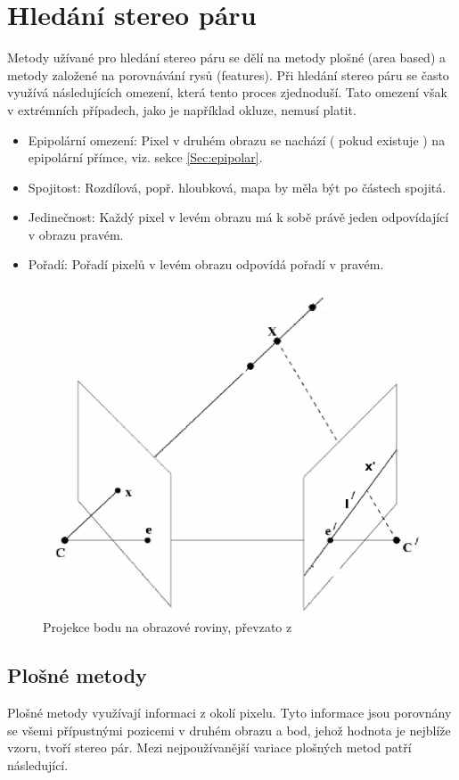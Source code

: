 \documentclass[twoside]{ctuthesis}
\begin{document}
\section{Hledání stereo páru}
Metody užívané pro hledání stereo páru se dělí na metody plošné (area based) a metody založené na porovnávání rysů (features). Při hledání stereo páru se často využívá následujících omezení, která tento proces zjednoduší. Tato omezení však v extrémních případech, jako je například okluze,  nemusí platit.
\begin{itemize}
    \item Epipolární omezení: Pixel v druhém obrazu se nachází ( pokud existuje ) na epipolární přímce, viz. sekce \ref{Sec:epipolar}.
    \item Spojitost: Rozdílová, popř. hloubková, mapa by měla být po částech spojitá.
    \item Jedinečnost: Každý pixel v levém obrazu má k sobě právě jeden odpovídající v obrazu pravém. 
    \item Pořadí: Pořadí pixelů v levém obrazu odpovídá pořadí v pravém.
\end{itemize}
\begin{figure}
    \centering
    \includegraphics[width = 0.6\linewidth]{pictures/epipolar_g_sketch.png}
    \caption{Projekce bodu na obrazové roviny, převzato z \cite{epipolar_pic}}
    \label{fig:epipolar}
\end{figure}

\subsection{Plošné metody}
Plošné metody využívají informaci z okolí pixelu. Tyto informace jsou porovnány se všemi přípustnými pozicemi v druhém obrazu a bod, jehož hodnota je nejblíže vzoru, tvoří stereo pár. Mezi nejpoužívanější variace plošných metod patří následující.
\end{document}
